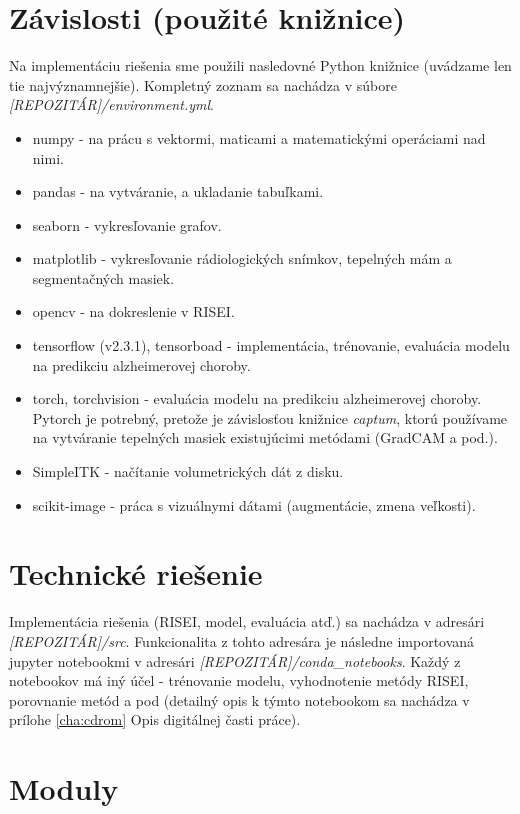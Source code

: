 \section{Závislosti (použité knižnice)}

Na implementáciu riešenia sme použili nasledovné Python knižnice (uvádzame len tie najvýznamnejšie). Kompletný zoznam sa nachádza v súbore \textit{[REPOZITÁR]/environment.yml}.

\begin{itemize}
    \item numpy - na prácu s vektormi, maticami a matematickými operáciami nad nimi.
    \item pandas - na vytváranie, a ukladanie tabuľkami.
    \item seaborn - vykresľovanie grafov.
    \item matplotlib - vykresľovanie rádiologických snímkov, tepelných mám a segmentačných masiek.
    \item opencv - na dokreslenie v RISEI.
    \item tensorflow (v2.3.1), tensorboad - implementácia, trénovanie, evaluácia modelu na predikciu alzheimerovej choroby.
    \item torch, torchvision - evaluácia modelu na predikciu alzheimerovej choroby. Pytorch je potrebný, pretože je závislosťou knižnice \textit{captum}, ktorú používame na vytváranie tepelných masiek existujúcimi metódami (GradCAM a pod.).
    \item SimpleITK - načítanie volumetrických dát z disku.
    \item scikit-image - práca s vizuálnymi dátami (augmentácie, zmena veľkosti).
\end{itemize}

\section{Technické riešenie}

Implementácia riešenia (RISEI, model, evaluácia atď.) sa nachádza v adresári \textit{[REPOZITÁR]/src}. Funkcionalita z tohto adresára je následne importovaná jupyter notebookmi v adresári \textit{[REPOZITÁR]/conda\_notebooks}. Každý z notebookov má iný účel - trénovanie modelu, vyhodnotenie metódy RISEI, porovnanie metód a pod (detailný opis k týmto notebookom sa nachádza v prílohe \ref{cha:cdrom} Opis digitálnej časti práce).

\section{Moduly}

